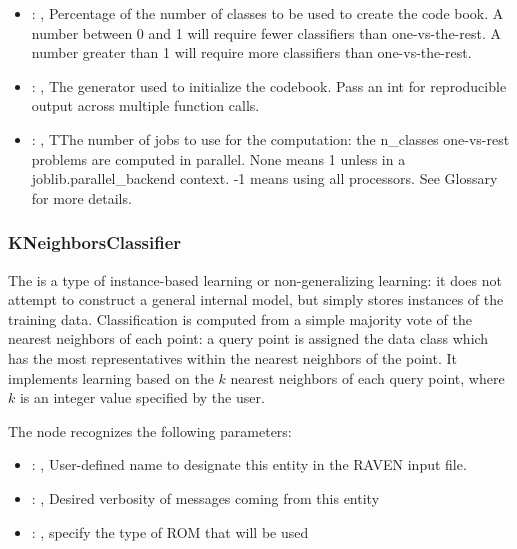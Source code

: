 \begin{itemize}
    \item {}: , 
      Percentage of the number of classes to be used to create
      the code book. A number between 0 and 1 will require fewer classifiers
      than one-vs-the-rest. A number greater than 1 will require more classifiers
      than one-vs-the-rest.

    \item {}: , 
      The generator used to initialize the codebook. Pass an int
      for reproducible output across multiple function calls.

    \item {}: , 
      TThe number of jobs to use for the computation: the n\_classes one-vs-rest
      problems are computed in parallel. None means 1 unless in a joblib.parallel\_backend
      context. -1 means using all processors. See Glossary for more details.
  \end{itemize}


\subsubsection{KNeighborsClassifier}
  The  is a type of instance-based learning or
  non-generalizing learning: it does not attempt to construct a general internal
  model, but simply stores instances of the training data.                          Classification
  is computed from a simple majority vote of the nearest neighbors                          of each
  point: a query point is assigned the data class which has the most
  representatives within the nearest neighbors of the point.                          It implements
  learning based on the $k$ nearest neighbors of each query point,                          where
  $k$ is an integer value specified by the user.

  The  node recognizes the following parameters:
    \begin{itemize}
      \item {}: , 
        User-defined name to designate this entity in the RAVEN input file.
      \item {}: , 
        Desired verbosity of messages coming from this entity
      \item {}: , 
        specify the type of ROM that will be used
  \end{itemize}

